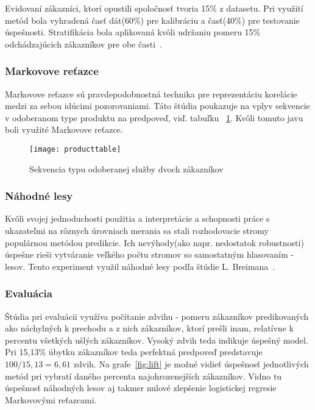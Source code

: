 Evidovaní zákazníci, ktorí opustili spoločnosť tvoria 15\% z datasetu. Pri využití metód bola vyhradená časť dát(60\%) pre kalibráciu a časť(40\%) pre testovanie úspešnosti. Stratifikácia bola aplikovaná kvôli udržaniu pomeru 15\% odchádzajúcich zákazníkov pre obe časti~\cite{neslin2004defection}.

\subsubsection{Markovove reťazce}
\label{markov_markov}

Markovove reťazce sú pravdepodobnostná technika pre reprezentáciu korelácie medzi za sebou idúcimi pozorovaniami. Táto štúdia poukazuje na vplyv sekvencie v odoberanom type produktu na predpoveď, viď. tabuľku ~\ref{fig:producttable}. Kvôli tomuto javu boli využité Markovove reťazce.


\begin{figure}[H]
\begin{center}
\texttt{[image: producttable]}\end{center}
\caption[producttable]{Sekvencia typu odoberanej služby dvoch zákazníkov~\cite{burez2007crm}}
\label{fig:producttable}
\end{figure}

\subsubsection{Náhodné lesy}
\label{markov_lesy}

Kvôli svojej jednoduchosti použitia a interpretácie a schopnosti práce s ukazateľmi na rôznych úrovniach merania sa stali rozhodovacie stromy populárnou metódou predikcie. Ich nevýhody(ako napr. nedostatok robustnosti) úspešne rieši vytváranie veľkého počtu stromov so samostatným hlasovaním - lesov. Tento experiment využil náhodné lesy podľa štúdie L. Breimana~\cite{breiman2001random}.

\subsubsection{Evaluácia}
\label{markov_evaluacia}

Štúdia pri evaluácii využíva počítanie zdvihu - pomeru zákazníkov predikovaných ako náchylných k prechodu a z nich zákazníkov, ktorí prešli inam, relatívne k percentu všetkých ušlých zákazníkov. Vysoký zdvih teda indikuje úspešný model. Pri 15,13\% úbytku zákazníkov teda perfektná predpoveď predstavuje $100/15,13 = 6,61$ zdvih. Na grafe~\ref{fig:lift} je možné vidieť úspešnosť jednotlivých metód pri vybratí daného percenta najohrozenejších zákazníkov. Vidno tu úspešnosť náhodných lesov aj takmer nulové zlepšenie logistickej regresie Markovovými reťazcami.


